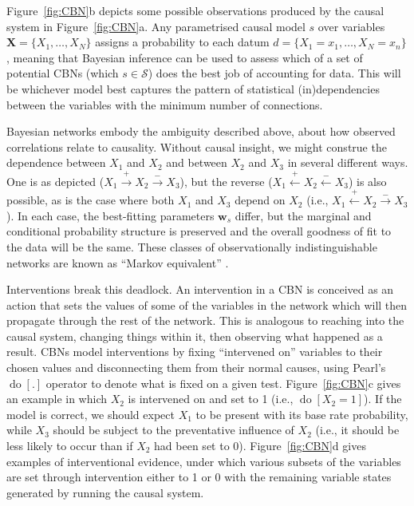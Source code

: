 \documentclass{cambridge7A}%
\DeclareMathOperator*{\Do}{do}
\newcommand{\ww}{\mathbf{w}} %
\newcommand{\dm}{d} %
\begin{document}
Figure~\ref{fig:CBN}b depicts some possible observations 
produced by the causal system in Figure~\ref{fig:CBN}a. 
Any parametrised causal model $s$ over variables $\mathbf{X} =\{X_1, \ldots, X_N\}$ assigns a probability to each datum ${\dm}=\{X_1=x_1, \ldots, X_N=x_n\}$, meaning that Bayesian inference can be used to assess which of a set of potential CBNs (which $s\in\mathcal{S}$) does the best job of accounting for data.  This will be whichever model best captures the pattern of statistical (in)dependencies between the variables with the minimum number of connections.

Bayesian networks embody the ambiguity described above, about how observed correlations relate to causality.  Without causal insight, we might construe the dependence between $X_1$ and $X_2$ and between $X_2$ and $X_3$ in several different ways.  One is as depicted ($X_1\!\stackrel{+}\rightarrow\!X_2\!\stackrel{-}\rightarrow\!X_3$), but the reverse ($X_1\!\stackrel{+}\leftarrow\!X_2\!\stackrel{-}\leftarrow\!X_3$) is also possible, as is the case where both $X_1$ and $X_3$ depend on $X_2$ (i.e., $X_1\!\stackrel{+}\leftarrow\!X_2\!\stackrel{-}\rightarrow\!X_3$).  In each case, the best-fitting parameters $\ww_s$ differ, but the marginal and conditional probability structure is preserved and the overall goodness of fit to the data will be the same.  These classes of observationally indistinguishable networks are known as ``Markov equivalent'' \citep{pearl2000causality}.

Interventions break this deadlock.  An intervention in a CBN is conceived as an action that sets the values of some of the variables in the network which will then propagate through the rest of the network.   This is analogous to reaching into the causal system, changing things within it, then observing what happened as a result. CBNs model interventions by fixing ``intervened on'' variables to their chosen values and disconnecting them from their normal causes, using Pearl's $\Do[.]$ operator \citep{pearl2000causality} to denote what is fixed on a given test.  Figure~\ref{fig:CBN}c gives an example in which $X_2$ is intervened on and set to 1 (i.e., $\Do[X_2=1]$).  If the model is correct, we should expect $X_1$ to be present with its base rate probability, while $X_3$ should be subject to the preventative influence of $X_2$ (i.e., it should be less likely to occur than if $X_2$ had been set to 0).  Figure~\ref{fig:CBN}d gives examples of interventional evidence, under which various subsets of the variables are set through intervention either to 1 or 0 with the remaining variable states generated by running the causal system.
\end{document}
